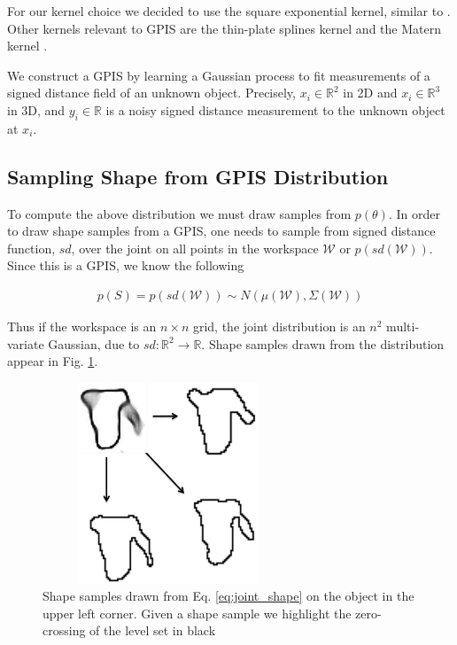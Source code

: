 \documentclass[letterpaper, 10 pt, conference]{ieeeconf}  %
\begin{document}
For our kernel choice we decided to use the square exponential kernel, similar to \cite{dragiev2011}. Other kernels relevant to GPIS are the thin-plate splines kernel and the Matern kernel \cite{williams2007}. 


We construct a GPIS by learning a Gaussian process to fit measurements of a signed distance field of an unknown object.  Precisely, $x_i \in \mathbb{R}^2$ in 2D and $x_i \in \mathbb{R}^3$ in 3D, and $y_i \in \mathbb{R}$ is a noisy signed distance measurement to the unknown object at $x_i$.



\subsection{Sampling Shape from GPIS Distribution }
To compute the above distribution we must draw samples from $p(\theta)$. In order to draw shape samples from a GPIS, one needs to sample from signed distance function, $sd$, over the joint on all points in the workspace $\mathcal{W}$ or $p(sd(\mathcal{W}))$. Since this is a GPIS, we know the following 

\vspace{-2ex}
\begin{align}\label{eq:joint_shape}
p(S) = p(sd(\mathcal{W})) \sim N(\mu(\mathcal{W}),\Sigma(\mathcal{W}))
\end{align}

Thus if the workspace is an $n \times n$ grid, the joint distribution is an  $n^2$ multi-variate Gaussian, due to $sd:\mathbb{R}^2 \rightarrow \mathbb{R}$.  Shape samples drawn from the distribution appear in Fig. \ref{fig:shape_samples}.


\begin{figure}[ht!]
\centering
\includegraphics[width = 7.5cm, height= 6cm ]{figures/Slide13.jpg}
\caption{Shape samples drawn from Eq. \ref{eq:joint_shape} on the object in the upper left corner. Given a shape sample we highlight the zero-crossing of the level set in black}
\vspace*{-10pt}
\label{fig:shape_samples}
\end{figure}
\end{document}
